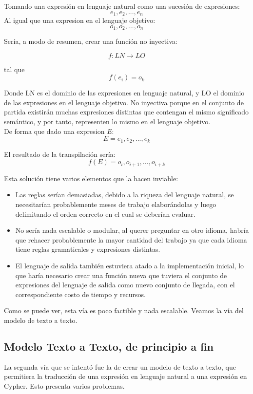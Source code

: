 Tomando una expresi\'on en lenguaje natural como una sucesi\'on de expresiones:
$$ e_1, e_2, ..., e_n$$
Al igual que una expresion en el lenguaje objetivo:
$$ o_1, o_2, ..., o_n$$

Ser\'ia, a modo de resumen, crear una funci\'on no inyectiva:

$$f:LN\rightarrow LO$$

tal que\\

$$f(e_i) = o_k$$

Donde LN es el dominio de las expresiones en lenguaje natural, y LO el dominio de las expresiones en el lenguaje objetivo. No inyectiva porque en el conjunto de partida existir\'an muchas expresiones distintas que contengan el mismo significado sem\'antico, y por tanto, representen lo mismo en el lenguaje objetivo.\\

De forma que dado una expresion $E$:
$$ E = e_1, e_2, ..., e_k $$

El resultado de la transpilaci\'on ser\'ia:
$$ f(E) = o_i, o_{i+1}, ..., o_{i+k} $$

Esta soluci\'on tiene varios elementos que la hacen inviable:\\
\begin{itemize}
    \item Las reglas ser\'ian demasiadas, debido a la riqueza del lenguaje natural, se necesitar\'ian probablemente meses de trabajo elabor\'andolas y luego delimitando el orden correcto en el cual se deber\'ian evaluar.

    \item No ser\'ia nada escalable o modular, al querer preguntar en otro idioma, habr\'ia que rehacer probablemente la mayor cantidad del trabajo ya que cada idioma tiene reglas gramaticales y expresiones distintas.

    \item El lenguaje de salida tambi\'en estuviera atado a la implementaci\'on inicial, lo que har\'ia necesario crear una funci\'on nueva que tuviera el conjunto de expresiones del lenguaje de salida como nuevo conjunto de llegada, con el correspondiente costo de tiempo y recursos.
\end{itemize}   

Como se puede ver, esta v\'ia es poco factible y nada escalable. Veamos la v\'ia del modelo de texto a texto.\\

\subsection*{Modelo Texto a Texto, de principio a fin}
La segunda v\'ia que se intent\'o fue la de crear un modelo de texto a texto, que permitiera la traducci\'on de una expresi\'on en lenguaje natural a una expresi\'on en Cypher. Esto presenta varios problemas.\\

